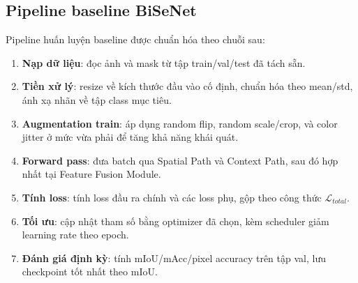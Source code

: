 \subsection{Pipeline baseline BiSeNet}
Pipeline huấn luyện baseline được chuẩn hóa theo chuỗi sau:
\begin{enumerate}[leftmargin=1.8em]
    \item \textbf{Nạp dữ liệu}: đọc ảnh và mask từ tập train/val/test đã tách sẵn.
    \item \textbf{Tiền xử lý}: resize về kích thước đầu vào cố định, chuẩn hóa theo mean/std, ánh xạ nhãn về tập class mục tiêu.
    \item \textbf{Augmentation train}: áp dụng random flip, random scale/crop, và color jitter ở mức vừa phải để tăng khả năng khái quát.
    \item \textbf{Forward pass}: đưa batch qua Spatial Path và Context Path, sau đó hợp nhất tại Feature Fusion Module.
    \item \textbf{Tính loss}: tính loss đầu ra chính và các loss phụ, gộp theo công thức $\mathcal{L}_{total}$.
    \item \textbf{Tối ưu}: cập nhật tham số bằng optimizer đã chọn, kèm scheduler giảm learning rate theo epoch.
    \item \textbf{Đánh giá định kỳ}: tính mIoU/mAcc/pixel accuracy trên tập val, lưu checkpoint tốt nhất theo mIoU.
\end{enumerate}

